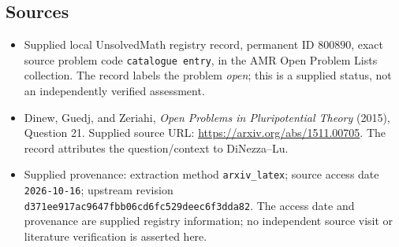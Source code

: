 \documentclass[11pt]{article}
\begin{document}
\subsection{Sources}
\begin{itemize}
\item Supplied local UnsolvedMath registry record, permanent ID \(800890\), exact source problem code \texttt{catalogue entry}, in the AMR Open Problem Lists collection. The record labels the problem \emph{open}; this is a supplied status, not an independently verified assessment.
\item Dinew, Guedj, and Zeriahi, \emph{Open Problems in Pluripotential Theory} (2015), Question 21. Supplied source URL: \url{https://arxiv.org/abs/1511.00705}. The record attributes the question/context to DiNezza--Lu.
\item Supplied provenance: extraction method \texttt{arxiv\_latex}; source access date \texttt{2026-10-16}; upstream revision \texttt{d371ee917ac9647fbb06cd6fc529deec6f3dda82}. The access date and provenance are supplied registry information; no independent source visit or literature verification is asserted here.
\end{itemize}
\end{document}
